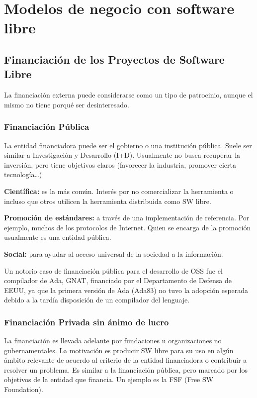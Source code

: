 
\chapter{Modelos de negocio con software libre}




\section{Financiación de los Proyectos de Software Libre}

La financiación externa puede considerarse como un tipo de patrocinio, aunque el mismo no tiene porqué ser desinteresado.

\subsection{Financiación Pública}

La entidad financiadora puede ser el gobierno o una institución pública. Suele ser similar a Investigación y Desarrollo (I+D). Usualmente no busca recuperar la inversión, pero tiene objetivos claros (favorecer la industria, promover cierta tecnología…)

{\bf Científica: } es la más común. Interés por no comercializar la herramienta o incluso que otros utilicen la herramienta distribuida como SW libre.

{\bf Promoción de estándares: } a través de una implementación de referencia. Por ejemplo, muchos de los protocolos de Internet. Quien se encarga de la promoción usualmente es una entidad pública.

{\bf Social: } para ayudar al acceso universal de la sociedad a la información. 

Un notorio caso de financiación pública para el desarrollo de OSS fue el compilador de Ada, GNAT, financiado por el Departamento de Defensa de EEUU, ya que la primera versión de Ada (Ada83) no tuvo la adopción esperada debido a la tardía disposición de un compilador del lenguaje.


\subsection{Financiación Privada sin ánimo de lucro}

La financiación es llevada adelante por fundaciones u organizaciones no gubernamentales. La motivación es producir SW libre para su uso en algún ámbito relevante de acuerdo al criterio de la entidad financiadora o contribuir a resolver un problema. Es similar a la financiación pública, pero marcado por los objetivos de la entidad que financia.
Un ejemplo es la FSF (Free SW Foundation).


